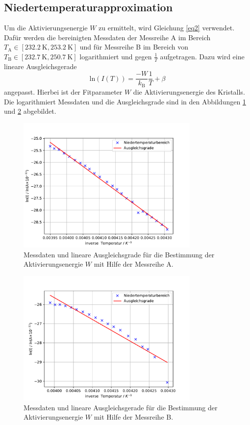 \subsection{Niedertemperaturapproximation}
Um die Aktivierungsenergie $W$ zu ermittelt, wird Gleichung \eqref{eq2} verwendet.
Dafür werden die bereinigten Messdaten der Messreihe A im Bereich $T_{\text{A}}\in \left[\SI{232.2}{\kelvin},\SI{253.2}{\kelvin}\right]$
und für Messreihe B im Bereich von $T_{\text{B}}\in \left[\SI{232.7}{\kelvin},\SI{250.7}{\kelvin}\right]$ logarithmiert und gegen $\frac{1}{T}$ aufgetragen.
Dazu wird eine lineare Ausgleichsgerade 
\begin{equation*}
    \text{ln}\left(I(T)\right) = \frac{-W}{k_{\text{{B}}}} \frac{1}{T} +\beta
\end{equation*}
angepasst. Hierbei ist der Fitparameter $W$ die Aktivierungsenergie des Kristalls.
Die logarithmiert Messdaten und die Ausgleichsgrade sind in den Abbildungen \ref{fig:Lin_fit_W_A} und \ref{fig:Lin_fit_W_B}
abgebildet.
\FloatBarrier
\begin{figure}
    \centering
    \includegraphics[width=0.8\textwidth,keepaspectratio]{figure/LinFit_W_A.pdf}
    \caption{Messdaten und lineare Ausgleichsgrade für die Bestimmung der Aktivierungsenergie $W$ mit Hilfe der Messreihe A.}
    \label{fig:Lin_fit_W_A}
\end{figure}
\begin{figure}
    \centering
    \includegraphics[width=0.8\textwidth,keepaspectratio]{figure/LinFit_W_B.pdf}
    \caption{Messdaten und lineare Ausgleichsgerade für die Bestimmung der Aktivierungsenergie $W$ mit Hilfe der Messreihe B.}
    \label{fig:Lin_fit_W_B}
\end{figure}
